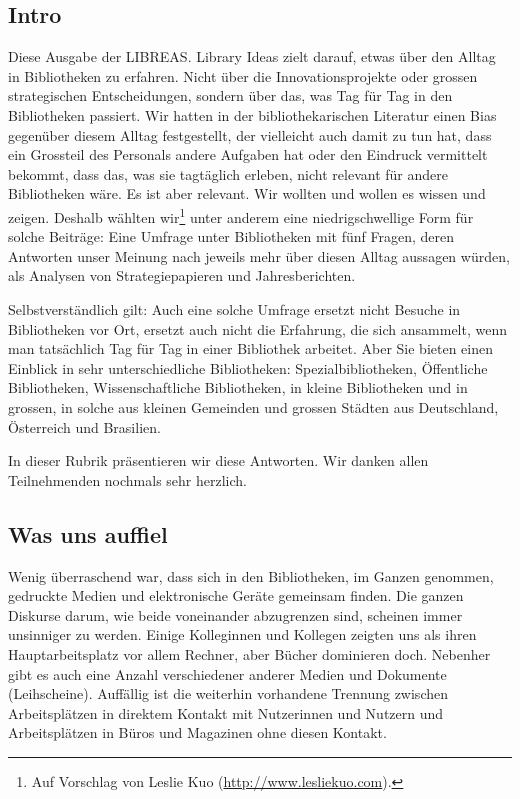 \hypertarget{intro}{%
\subsection{Intro}\label{intro}}

Diese Ausgabe der LIBREAS. Library Ideas zielt darauf, etwas über den
Alltag in Bibliotheken zu erfahren. Nicht über die Innovationsprojekte
oder grossen strategischen Entscheidungen, sondern über das, was Tag für
Tag in den Bibliotheken passiert. Wir hatten in der bibliothekarischen
Literatur einen Bias gegenüber diesem Alltag festgestellt, der
vielleicht auch damit zu tun hat, dass ein Grossteil des Personals
andere Aufgaben hat oder den Eindruck vermittelt bekommt, dass das, was
sie tagtäglich erleben, nicht relevant für andere Bibliotheken wäre. Es
ist aber relevant. Wir wollten und wollen es wissen und zeigen. Deshalb
wählten wir\footnote{Auf Vorschlag von Leslie Kuo (\href{http://www.lesliekuo.com}{http://www.lesliekuo.com}).} unter anderem eine
niedrigschwellige Form für solche Beiträge: Eine Umfrage unter
Bibliotheken mit fünf Fragen, deren Antworten unser Meinung nach jeweils
mehr über diesen Alltag aussagen würden, als Analysen von
Strategiepapieren und Jahresberichten.

Selbstverständlich gilt: Auch eine solche Umfrage ersetzt nicht Besuche
in Bibliotheken vor Ort, ersetzt auch nicht die Erfahrung, die sich
ansammelt, wenn man tatsächlich Tag für Tag in einer Bibliothek
arbeitet. Aber Sie bieten einen Einblick in sehr unterschiedliche
Bibliotheken: Spezialbibliotheken, Öffentliche Bibliotheken,
Wissenschaftliche Bibliotheken, in kleine Bibliotheken und in grossen,
in solche aus kleinen Gemeinden und grossen Städten aus Deutschland,
Österreich und Brasilien.

In dieser Rubrik präsentieren wir diese Antworten. Wir danken allen
Teilnehmenden nochmals sehr herzlich.

\hypertarget{was-uns-auffiel}{%
\subsection{Was uns auffiel}\label{was-uns-auffiel}}

Wenig überraschend war, dass sich in den Bibliotheken, im Ganzen
genommen, gedruckte Medien und elektronische Geräte gemeinsam finden.
Die ganzen Diskurse darum, wie beide voneinander abzugrenzen sind,
scheinen immer unsinniger zu werden. Einige Kolleginnen und Kollegen
zeigten uns als ihren Hauptarbeitsplatz vor allem Rechner, aber Bücher
dominieren doch. Nebenher gibt es auch eine Anzahl verschiedener anderer
Medien und Dokumente (Leihscheine). Auffällig ist die weiterhin
vorhandene Trennung zwischen Arbeitsplätzen in direktem Kontakt mit
Nutzerinnen und Nutzern und Arbeitsplätzen in Büros und Magazinen ohne
diesen Kontakt.

